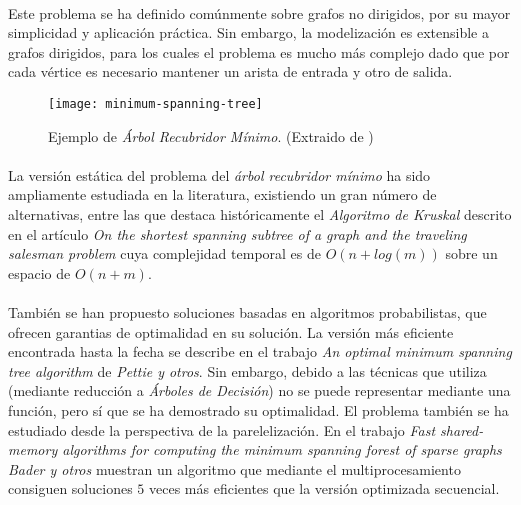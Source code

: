 \documentclass{subfiles}
\begin{document}
        \paragraph{}
        Este problema se ha definido comúnmente sobre grafos no dirigidos, por su mayor simplicidad y aplicación práctica. Sin embargo, la modelización es extensible a grafos dirigidos, para los cuales el problema es mucho más complejo dado que por cada vértice es necesario mantener un arista de entrada y otro de salida.

        \begin{figure}
          \centering
          \texttt{[image: minimum-spanning-tree]}
          \caption{Ejemplo de \emph{Árbol Recubridor Mínimo}. (Extraido de \cite{wiki:Minimum_spanning_tree})}
          \label{img:minimum_spanning_tree}
        \end{figure}

        \paragraph{}
        La versión estática del problema del \emph{árbol recubridor mínimo} ha sido ampliamente estudiada en la literatura, existiendo un gran número de alternativas, entre las que destaca históricamente el \emph{Algoritmo de Kruskal} descrito en el artículo \emph{On the shortest spanning subtree of a graph and the traveling salesman problem} \cite{kruskal1956shortest} cuya complejidad temporal es de $O(n + log(m))$ sobre un espacio de $O(n+m)$.

        \paragraph{}
        También se han propuesto soluciones basadas en algoritmos probabilistas, que ofrecen garantias de optimalidad en su solución. La versión más eficiente encontrada hasta la fecha se describe en el trabajo \emph{An optimal minimum spanning tree algorithm} \cite{pettie2002optimal} de \emph{Pettie y otros}. Sin embargo, debido a las técnicas que utiliza (mediante reducción a \emph{Árboles de Decisión}) no se puede representar mediante una función, pero sí que se ha demostrado su optimalidad. El problema también se ha estudiado desde la perspectiva de la parelelización. En el trabajo \emph{Fast shared-memory algorithms for computing the minimum spanning forest of sparse graphs} \cite{bader2006fast} \emph{Bader y otros} muestran un algoritmo que mediante el multiprocesamiento consiguen soluciones $5$ veces más eficientes que la versión optimizada secuencial.
\end{document}

